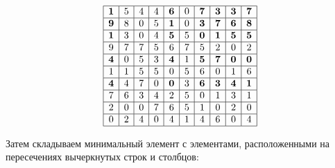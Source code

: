 \documentclass[17pt]{extarticle}
\begin{document}
\[
    \begin{array}{|*{10}{c|}}
        \hline
        \textbf{1} & 5 & 4 & 4 & \textbf{6} & 0 & \textbf{7} & \textbf{3} & \textbf{3} & \textbf{7} \\
        \hline
        \textbf{9} & 8 & 0 & 5 & \textbf{1} & 0 & \textbf{3} & \textbf{7} & \textbf{6} & \textbf{8} \\
        \hline
        \textbf{1} & 3 & 0 & 4 & \textbf{5} & 5 & \textbf{0} & \textbf{1} & \textbf{5} & \textbf{5} \\
        \hline
        9          & 7 & 7 & 5 & 6          & 7 & 5          & 2          & 0          & 2          \\
        \hline
        \textbf{4} & 0 & 5 & 3 & \textbf{4} & 1 & \textbf{5} & \textbf{7} & \textbf{0} & \textbf{0} \\
        \hline
        1          & 1 & 5 & 5 & 0          & 5 & 6          & 0          & 1          & 6          \\
        \hline
        \textbf{4} & 4 & 7 & 0 & \textbf{0} & 3 & \textbf{6} & \textbf{3} & \textbf{4} & \textbf{1} \\
        \hline
        7          & 6 & 3 & 4 & 2          & 5 & 0          & 1          & 3          & 1          \\
        \hline
        2          & 0 & 0 & 7 & 6          & 5 & 1          & 0          & 2          & 0          \\
        \hline
        0          & 2 & 4 & 0 & 4          & 1 & 4          & 6          & 0          & 4          \\
        \hline
    \end{array}
\]

Затем складываем минимальный элемент с элементами, расположенными на пересечениях вычеркнутых строк и столбцов:
\end{document}
